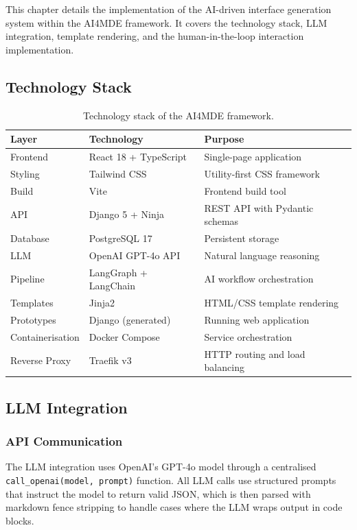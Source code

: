 This chapter details the implementation of the AI-driven interface generation system within the AI4MDE framework. It covers the technology stack, LLM integration, template rendering, and the human-in-the-loop interaction implementation.

\subsection{Technology Stack}

\begin{table}[H]
\centering
\begin{tabular}{lll}
\hline
\textbf{Layer} & \textbf{Technology} & \textbf{Purpose} \\
\hline
Frontend & React 18 + TypeScript & Single-page application \\
Styling & Tailwind CSS & Utility-first CSS framework \\
Build & Vite & Frontend build tool \\
API & Django 5 + Ninja & REST API with Pydantic schemas \\
Database & PostgreSQL 17 & Persistent storage \\
LLM & OpenAI GPT-4o API & Natural language reasoning \\
Pipeline & LangGraph + LangChain & AI workflow orchestration \\
Templates & Jinja2 & HTML/CSS template rendering \\
Prototypes & Django (generated) & Running web application \\
Containerisation & Docker Compose & Service orchestration \\
Reverse Proxy & Traefik v3 & HTTP routing and load balancing \\
\hline
\end{tabular}
\caption{Technology stack of the AI4MDE framework.}
\label{tab:tech_stack}
\end{table}


\subsection{LLM Integration}

\subsubsection{API Communication}

The LLM integration uses OpenAI's GPT-4o model through a centralised \texttt{call\_openai(model, prompt)} function. All LLM calls use structured prompts that instruct the model to return valid JSON, which is then parsed with markdown fence stripping to handle cases where the LLM wraps output in code blocks.

